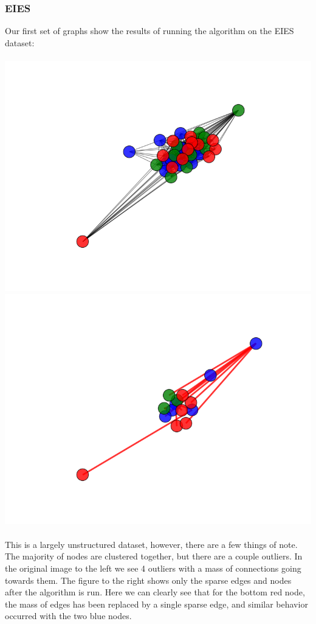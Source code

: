 \documentclass{article}
\begin{document}
\subsubsection{EIES}
Our first set of graphs show the results of running the algorithm on the EIES dataset:\\\\
\includegraphics[scale=0.4]{imgs/EIES/original.png}
\includegraphics[scale=0.4]{imgs/EIES/hard.png}
\\\\
This is a largely unstructured dataset, however, there are a few things of note. The majority of nodes are clustered together, but there are a couple outliers. In the original image to the left we see 4 outliers with a mass of connections going towards them. The figure to the right shows only the sparse edges and nodes after the algorithm is run. Here we can clearly see that for the bottom red node, the mass of edges has been replaced by a single sparse edge, and similar behavior occurred with the two blue nodes.
\end{document}
